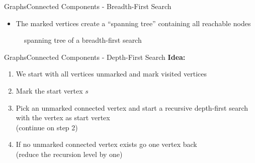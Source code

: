 
\begin{frame}{Graphs}{Connected Components - Breadth-First Search}
  \begin{itemize}
    \item
      The marked vertices create a \enquote{spanning tree} containing all
      reachable nodes
  \end{itemize}
  \begin{figure}
    \begin{adjustbox}{width=0.95\linewidth}
      
    \end{adjustbox}
    \caption{spanning tree of a breadth-first search}
    \label{fig:graph:breadth_first_search_spanning_tree}
  \end{figure}
\end{frame}


\begin{frame}{Graphs}{Connected Components - Depth-First Search}
  \textbf{Idea:}
  \begin{enumerate}
    \item
      We start with all vertices unmarked and
      {\color{Mittel-Blau}mark visited vertices}
    \item
      Mark the start vertex {\color{Mittel-Blau}$s$}
    \item
      Pick an unmarked {\color{Mittel-Blau}connected vertex} and start a
      {\color{Mittel-Blau}recursive depth-first search} with the vertex as
      start vertex\\
      (continue on step 2)
    \item
      If no unmarked connected vertex exists go one vertex back\\
      (reduce the recursion level by one)
  \end{enumerate}
\end{frame}


